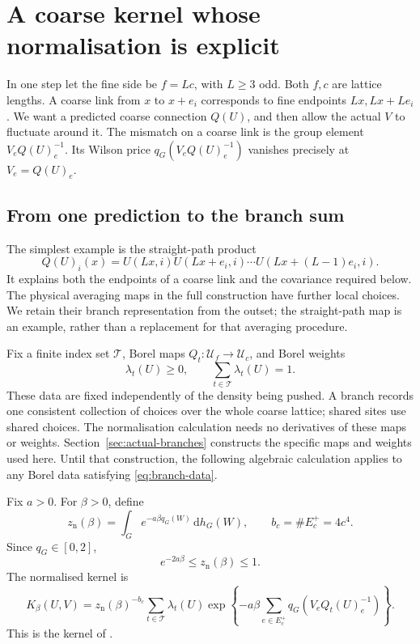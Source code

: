 \documentclass[11pt,reqno]{amsart}
\numberwithin{equation}{section}
\theoremstyle{definition}
\theoremstyle{remark}
\newcommand{\dd}{\mathrm d}
\begin{document}
\section{A coarse kernel whose normalisation is explicit}
\label{sec:kernel}

In one step let the fine side be \(f=Lc\), with \(L\ge3\) odd.
Both \(f,c\) are lattice lengths. A coarse link from \(x\) to
\(x+e_i\) corresponds to fine endpoints \(Lx,Lx+Le_i\).
We want a predicted coarse connection \(Q(U)\), and then allow the
actual \(V\) to fluctuate around it. The mismatch on a coarse link
is the group element \(V_eQ(U)_e^{-1}\). Its Wilson price
\(q_G(V_eQ(U)_e^{-1})\) vanishes precisely at \(V_e=Q(U)_e\).

\subsection{From one prediction to the branch sum}

The simplest example is the straight-path product
\begin{equation}
 Q(U)_i(x)=U(Lx,i)U(Lx+e_i,i)\cdots
                                U(Lx+(L-1)e_i,i).
 \label{eq:straight-predictor}
\end{equation}
It explains both the endpoints of a coarse link and the covariance
required below. The physical averaging maps in the full construction
have further local choices. We retain their branch representation
from the outset; the straight-path map is an example, rather than a
replacement for that averaging procedure.

Fix a finite index set \(\mathcal T\), Borel maps
\(Q_t:\mathcal U_f\to\mathcal U_c\), and Borel weights
\begin{equation}
       \lambda_t(U)\ge0,\qquad \sum_{t\in\mathcal T}\lambda_t(U)=1.
 \label{eq:branch-data}
\end{equation}
These data are fixed independently of the density being pushed.
A branch records one consistent collection of choices over the whole
coarse lattice; shared sites use shared choices. The normalisation
calculation needs no derivatives of these maps or weights.
Section~\ref{sec:actual-branches} constructs the specific maps and
weights used here. Until that construction, the following algebraic
calculation applies to any Borel data satisfying
\eqref{eq:branch-data}.

Fix \(a>0\). For \(\beta>0\), define
\begin{equation}
 z_{\mathrm n}(\beta)=\int_Ge^{-a\beta q_G(W)}\,\dd h_G(W),
 \qquad b_c=\#E_c^+=4c^4.
 \label{eq:noise-normaliser}
\end{equation}
Since \(q_G\in[0,2]\),
\begin{equation}
                     e^{-2a\beta}\le z_{\mathrm n}(\beta)\le1.
 \label{eq:noise-bounds}
\end{equation}
The normalised kernel is
\begin{equation}
 K_\beta(U,V)=z_{\mathrm n}(\beta)^{-b_c}
       \sum_{t\in\mathcal T}\lambda_t(U)
       \exp\left\{-a\beta\sum_{e\in E_c^+}
                         q_G(V_eQ_t(U)_e^{-1})\right\}.
 \label{eq:physical-kernel}
\end{equation}
This is the kernel of \cite[(11.1)--(11.2), p.~36]{Main}.
\end{document}
